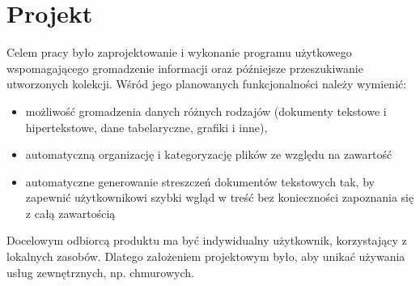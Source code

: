 \documentclass[12pt,a4paper,twoside]{article}
\begin{document}
\section{Projekt}
Celem pracy było zaprojektowanie i wykonanie programu użytkowego wspomagającego gromadzenie informacji oraz późniejsze przeszukiwanie utworzonych kolekcji.
Wśród jego planowanych funkcjonalności należy wymienić:
\begin{itemize}
	\item możliwość gromadzenia danych różnych rodzajów (dokumenty tekstowe i hipertekstowe, dane tabelaryczne, grafiki i inne),
	\item automatyczną organizację i kategoryzację plików ze względu na zawartość
	\item automatyczne generowanie streszczeń dokumentów tekstowych tak, by zapewnić użytkownikowi szybki wgląd w treść bez konieczności zapoznania się z całą zawartością
\end{itemize}
Docelowym odbiorcą produktu ma być indywidualny użytkownik, korzystający z lokalnych zasobów. Dlatego założeniem projektowym było, aby unikać używania usług zewnętrznych, np. chmurowych.
\end{document}
